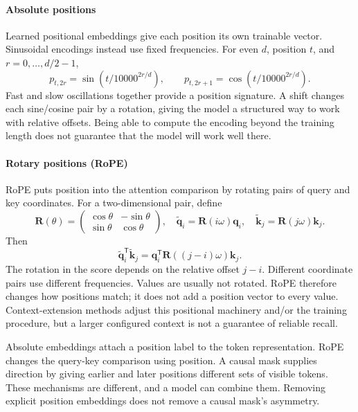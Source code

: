 \documentclass[11pt, oneside]{book}
\newcommand{\T}{^{\mathsf{T}}}           %
\begin{document}
\paragraph{Absolute positions} Learned positional embeddings give each position its own trainable vector. Sinusoidal encodings instead use fixed frequencies. For even $d$, position $t$, and $r=0,\ldots,d/2-1$,
\[
 p_{t,2r}=\sin(t/10000^{2r/d}),\qquad
 p_{t,2r+1}=\cos(t/10000^{2r/d}).
\]
Fast and slow oscillations together provide a position signature. A shift changes each sine/cosine pair by a rotation, giving the model a structured way to work with relative offsets. Being able to compute the encoding beyond the training length does not guarantee that the model will work well there.

\paragraph{Rotary positions (RoPE)} RoPE puts position into the attention comparison by rotating pairs of query and key coordinates. For a two-dimensional pair, define
\[
 \mathbf{R}(\theta)=\begin{pmatrix}\cos\theta&-\sin\theta\\\sin\theta&\cos\theta\end{pmatrix},
 \quad \widetilde{\mathbf{q}}_i=\mathbf{R}(i\omega)\mathbf{q}_i,
 \quad \widetilde{\mathbf{k}}_j=\mathbf{R}(j\omega)\mathbf{k}_j.
\]
Then
\[
 \widetilde{\mathbf{q}}_i\T\widetilde{\mathbf{k}}_j
 =\mathbf{q}_i\T\mathbf{R}((j-i)\omega)\mathbf{k}_j.
\]
The rotation in the score depends on the relative offset $j-i$. Different coordinate pairs use different frequencies. Values are usually not rotated. RoPE therefore changes how positions match; it does not add a position vector to every value. Context-extension methods adjust this positional machinery and/or the training procedure, but a larger configured context is not a guarantee of reliable recall.

\begin{intbox}[title={Order can enter in more than one place}]
Absolute embeddings attach a position label to the token representation. RoPE changes the query-key comparison using position. A causal mask supplies direction by giving earlier and later positions different sets of visible tokens. These mechanisms are different, and a model can combine them. Removing explicit position embeddings does not remove a causal mask's asymmetry.
\end{intbox}
\end{document}
